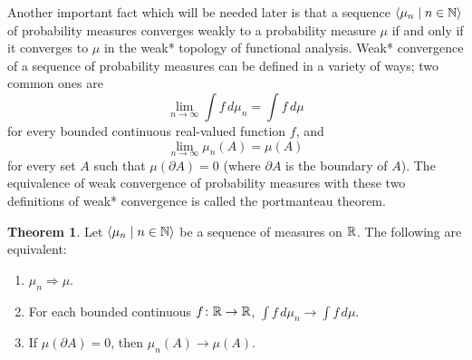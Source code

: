 \documentclass[leqno]{article}
\theoremstyle{definition}
\newtheorem{theorem}{Theorem}[section]
\newcommand{\bldseq}[2]{\langle{#1}\mid{#2}\rangle}
\begin{document}
Another important fact which will be needed later is that a sequence \linebreak $\bldseq{\mu_n}{n \in \N}$ of probability measures converges weakly to a probability measure $\mu$ if and only if it converges to $\mu$ in the weak* topology of functional analysis. Weak* convergence of a sequence of probability measures can be defined in a variety of ways; two common ones are
\[ \lim_{n \rightarrow \infty} \int f \, d\mu_n = \int f \, d\mu \]
for every bounded continuous real-valued function $f$, and
\[ \lim_{n \rightarrow \infty} \mu_n(A) = \mu(A) \]
for every set $A$ such that $\mu(\partial A) = 0$ (where $\partial A$ is the boundary of $A$). The equivalence of weak convergence of probability measures with these two definitions of weak* convergence is called the portmanteau theorem.

\begin{theorem}
Let $\bldseq{\mu_n}{n \in \N}$ be a sequence of measures on $\mathbb{R}$. The following are equivalent:
\begin{enumerate}
\item $\mu_n \Rightarrow \mu$.
\item For each bounded continuous $f\colon \mathbb{R} \rightarrow \mathbb{R}$, $\int f \, d\mu_n \rightarrow \int f \, d\mu$.
\item If $\mu(\partial A) = 0$, then $\mu_n(A) \rightarrow \mu(A)$.
\end{enumerate}
\end{theorem}
\end{document}
